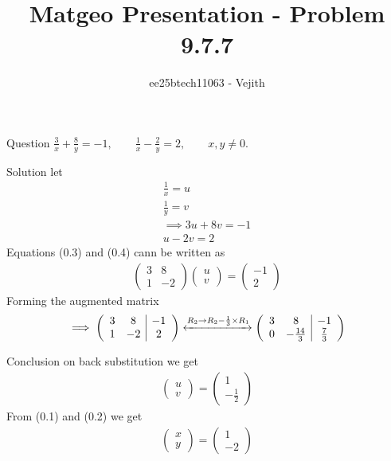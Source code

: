 \documentclass{beamer}
\title{Matgeo Presentation - Problem 9.7.7}
\author{ee25btech11063 - Vejith}
\numberwithin{equation}{section}
\theoremstyle{remark}
\newcommand{\myvec}[1]{\ensuremath{\begin{pmatrix}#1\end{pmatrix}}}
\begin{document}
\frame{\titlepage}
\begin{frame}{Question}
 \quad 
$\frac{3}{x} + \frac{8}{y} = -1, 
\qquad 
\frac{1}{x} - \frac{2}{y} = 2, 
\qquad x,y \neq 0.$
\end{frame}

\begin{frame}{Solution}
    let 
\begin{align}
    \frac{1}{x}=u\\
    \frac{1}{y}=v\\
    \implies 3u+8v=-1\\
    u-2v=2
\end{align}
Equations (0.3) and (0.4) cann be written as
\begin{align}
    \begin{pmatrix}
        3 & 8\\
        1 & -2
    \end{pmatrix}\myvec{u\\v}=\myvec{-1\\2}
\end{align}
Forming the augmented matrix
\begin{align}
    \implies 
\left(\begin{array}{cc|c}
        3 & 8 & -1 \\
        1 & -2 & 2 
\end{array}\right) 
\xleftrightarrow{R_2 \rightarrow R_2-\frac{1}{3} \times R_1} \left(\begin{array}{cc|c}
        3 & 8 & -1 \\
        0 & -\frac{14}{3} & \frac{7}{3} 
\end{array}\right) 
\end{align}
\end{frame}

\begin{frame}{Conclusion}
on back substitution we get 
\begin{align}
    \myvec{u\\v}=\myvec{1\\-\frac{1}{2}}
\end{align}
From (0.1) and (0.2) we get
\begin{align}
    \myvec{x\\y}=\myvec{1\\-2}
\end{align}
\end{frame}
\end{document}
